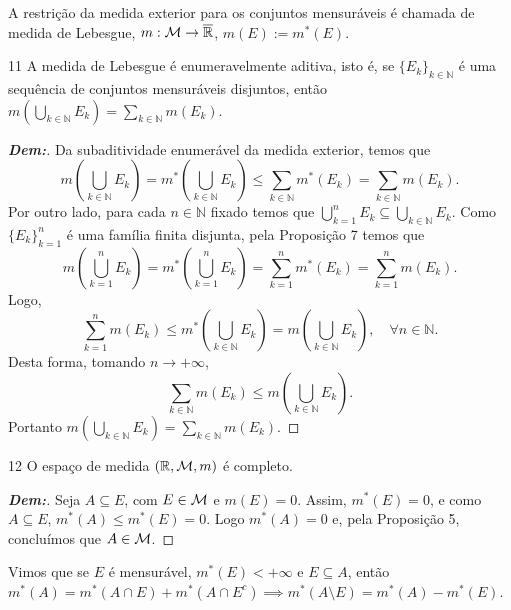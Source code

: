 
\begin{definition*}{}
A restrição da medida exterior para os conjuntos mensuráveis é chamada de medida de Lebesgue, $m: \mathcal{M} \rightarrow \overline{\mathbb{R}}$, $m(E) := m^*(E)$.
\end{definition*}

\begin{prop*}{11}
A medida de Lebesgue é enumeravelmente aditiva, isto é, se $\{E_k\}_{k \in \mathbb{N}}$ é uma sequência de conjuntos mensuráveis disjuntos, então $m\left(\bigcup_{k \in \mathbb{N}} E_k\right) = \sum_{k \in \mathbb{N}} m(E_k)$.
\end{prop*}{}

\begin{proof}[\textbf{Dem:}]
Da subaditividade enumerável da medida exterior, temos que
$$ m\left(\bigcup_{k \in \mathbb{N}} E_k\right) = m^*\left(\bigcup_{k \in \mathbb{N}} E_k\right) \le \sum_{k \in \mathbb{N}} m^*(E_k) = \sum_{k \in \mathbb{N}} m(E_k). $$
Por outro lado, para cada $n \in \mathbb{N}$ fixado temos que $\bigcup_{k=1}^n E_k \subseteq \bigcup_{k \in \mathbb{N}} E_k$. Como $\{E_k\}_{k=1}^n$ é uma família finita disjunta, pela Proposição 7 temos que
$$ m\left(\bigcup_{k=1}^n E_k\right) = m^*\left(\bigcup_{k=1}^n E_k\right) = \sum_{k=1}^n m^*(E_k) = \sum_{k=1}^n m(E_k). $$
Logo,
$$ \sum_{k=1}^n m(E_k) \le m^*\left(\bigcup_{k \in \mathbb{N}} E_k\right) = m\left(\bigcup_{k \in \mathbb{N}} E_k\right), \quad \forall n \in \mathbb{N}. $$
Desta forma, tomando $n \to +\infty$,
$$ \sum_{k \in \mathbb{N}} m(E_k) \le m\left(\bigcup_{k \in \mathbb{N}} E_k\right). $$
Portanto $m\left(\bigcup_{k \in \mathbb{N}} E_k\right) = \sum_{k \in \mathbb{N}} m(E_k)$.
\end{proof}

\begin{prop*}{12}
O espaço de medida $(\mathbb{R}, \mathcal{M}, m)$ é completo.
\end{prop*}{}

\begin{proof}[\textbf{Dem:}]
Seja $A \subseteq E$, com $E \in \mathcal{M}$ e $m(E) = 0$. Assim, $m^*(E) = 0$, e como $A \subseteq E$, $m^*(A) \le m^*(E) = 0$. Logo $m^*(A) = 0$ e, pela Proposição 5, concluímos que $A \in \mathcal{M}$.
\end{proof}


Vimos que se $E$ é mensurável, $m^*(E) < +\infty$ e $E \subseteq A$, então $m^*(A) = m^*(A \cap E) + m^*(A \cap E^c) \implies m^*(A \setminus E) = m^*(A) - m^*(E)$.

